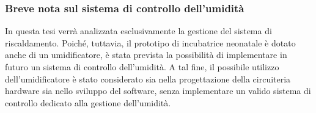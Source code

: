 \subsubsection{Breve nota sul sistema di controllo dell'umidità}
In questa tesi verrà analizzata esclusivamente la gestione del sistema di riscaldamento. Poiché, tuttavia, il prototipo
di incubatrice neonatale è dotato anche di un umidificatore, è stata prevista la possibilità di implementare in futuro
un sistema di controllo dell’umidità. A tal fine, il possibile utilizzo dell’umidificatore è stato considerato sia nella
progettazione della circuiteria hardware sia nello sviluppo del software, senza implementare un valido sistema di controllo
dedicato alla gestione dell’umidità.
